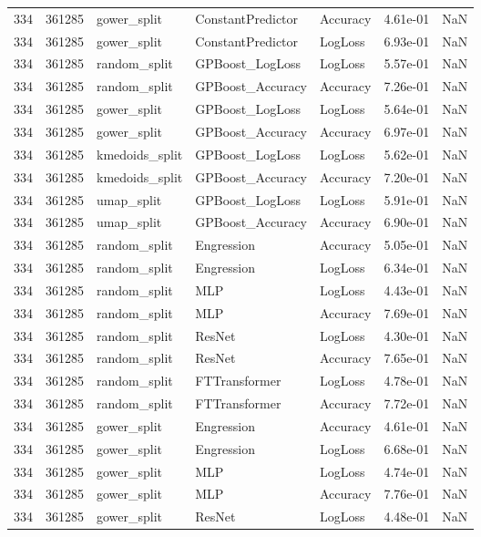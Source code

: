 \begin{tabular}{rrlllrr}
334 & 361285 & gower\_split & ConstantPredictor & Accuracy & 4.61e-01 & NaN \\
334 & 361285 & gower\_split & ConstantPredictor & LogLoss & 6.93e-01 & NaN \\
334 & 361285 & random\_split & GPBoost\_LogLoss & LogLoss & 5.57e-01 & NaN \\
334 & 361285 & random\_split & GPBoost\_Accuracy & Accuracy & 7.26e-01 & NaN \\
334 & 361285 & gower\_split & GPBoost\_LogLoss & LogLoss & 5.64e-01 & NaN \\
334 & 361285 & gower\_split & GPBoost\_Accuracy & Accuracy & 6.97e-01 & NaN \\
334 & 361285 & kmedoids\_split & GPBoost\_LogLoss & LogLoss & 5.62e-01 & NaN \\
334 & 361285 & kmedoids\_split & GPBoost\_Accuracy & Accuracy & 7.20e-01 & NaN \\
334 & 361285 & umap\_split & GPBoost\_LogLoss & LogLoss & 5.91e-01 & NaN \\
334 & 361285 & umap\_split & GPBoost\_Accuracy & Accuracy & 6.90e-01 & NaN \\
334 & 361285 & random\_split & Engression & Accuracy & 5.05e-01 & NaN \\
334 & 361285 & random\_split & Engression & LogLoss & 6.34e-01 & NaN \\
334 & 361285 & random\_split & MLP & LogLoss & 4.43e-01 & NaN \\
334 & 361285 & random\_split & MLP & Accuracy & 7.69e-01 & NaN \\
334 & 361285 & random\_split & ResNet & LogLoss & 4.30e-01 & NaN \\
334 & 361285 & random\_split & ResNet & Accuracy & 7.65e-01 & NaN \\
334 & 361285 & random\_split & FTTransformer & LogLoss & 4.78e-01 & NaN \\
334 & 361285 & random\_split & FTTransformer & Accuracy & 7.72e-01 & NaN \\
334 & 361285 & gower\_split & Engression & Accuracy & 4.61e-01 & NaN \\
334 & 361285 & gower\_split & Engression & LogLoss & 6.68e-01 & NaN \\
334 & 361285 & gower\_split & MLP & LogLoss & 4.74e-01 & NaN \\
334 & 361285 & gower\_split & MLP & Accuracy & 7.76e-01 & NaN \\
334 & 361285 & gower\_split & ResNet & LogLoss & 4.48e-01 & NaN \\

\end{tabular}
